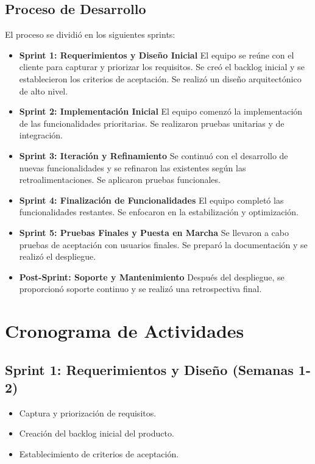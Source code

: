 \documentclass[conference]{IEEEtran}
\begin{document}
\subsection{Proceso de Desarrollo}
El proceso se dividió en los siguientes sprints:
\begin{itemize}
    \item \textbf{Sprint 1: Requerimientos y Diseño Inicial} El equipo se reúne con el cliente para capturar y priorizar los requisitos. Se creó el backlog inicial y se establecieron los criterios de aceptación. Se realizó un diseño arquitectónico de alto nivel.
    \item \textbf{Sprint 2: Implementación Inicial} El equipo comenzó la implementación de las funcionalidades prioritarias. Se realizaron pruebas unitarias y de integración.
    \item \textbf{Sprint 3: Iteración y Refinamiento} Se continuó con el desarrollo de nuevas funcionalidades y se refinaron las existentes según las retroalimentaciones. Se aplicaron pruebas funcionales.
    \item \textbf{Sprint 4: Finalización de Funcionalidades} El equipo completó las funcionalidades restantes. Se enfocaron en la estabilización y optimización.
    \item \textbf{Sprint 5: Pruebas Finales y Puesta en Marcha} Se llevaron a cabo pruebas de aceptación con usuarios finales. Se preparó la documentación y se realizó el despliegue.
    \item \textbf{Post-Sprint: Soporte y Mantenimiento} Después del despliegue, se proporcionó soporte continuo y se realizó una retrospectiva final.
\end{itemize}

\section{Cronograma de Actividades}
\subsection{Sprint 1: Requerimientos y Diseño (Semanas 1-2)}
\begin{itemize}
    \item Captura y priorización de requisitos.
    \item Creación del backlog inicial del producto.
    \item Establecimiento de criterios de aceptación.
\end{itemize}
\end{document}

